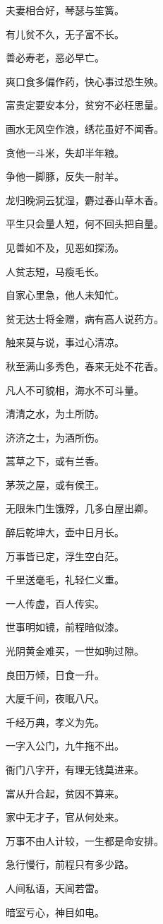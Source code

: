 \documentclass[12pt,oneside]{book}
\begin{document}
夫妻相合好，琴瑟与笙簧。

有儿贫不久，无子富不长。

善必寿老，恶必早亡。

爽口食多偏作药，快心事过恐生殃。

富贵定要安本分，贫穷不必枉思量。

画水无风空作浪，绣花虽好不闻香。

贪他一斗米，失却半年粮。

争他一脚豚，反失一肘羊。

龙归晚洞云犹湿，麝过春山草木香。

平生只会量人短，何不回头把自量。

见善如不及，见恶如探汤。

人贫志短，马瘦毛长。

自家心里急，他人未知忙。

贫无达士将金赠，病有高人说药方。

触来莫与说，事过心清凉。

秋至满山多秀色，春来无处不花香。

凡人不可貌相，海水不可斗量。

清清之水，为土所防。

济济之士，为酒所伤。

蒿草之下，或有兰香。

茅茨之屋，或有侯王。

无限朱门生饿殍，几多白屋出卿。

醉后乾坤大，壶中日月长。

万事皆已定，浮生空白茫。

千里送毫毛，礼轻仁义重。

一人传虚，百人传实。

世事明如镜，前程暗似漆。

光阴黄金难买，一世如驹过隙。

良田万倾，日食一升。

大厦千间，夜眠八尺。

千经万典，孝义为先。

一字入公门，九牛拖不出。

衙门八字开，有理无钱莫进来。

富从升合起，贫因不算来。

家中无才子，官从何处来。

万事不由人计较，一生都是命安排。

急行慢行，前程只有多少路。

人间私语，天闻若雷。

暗室亏心，神目如电。
\end{document}
